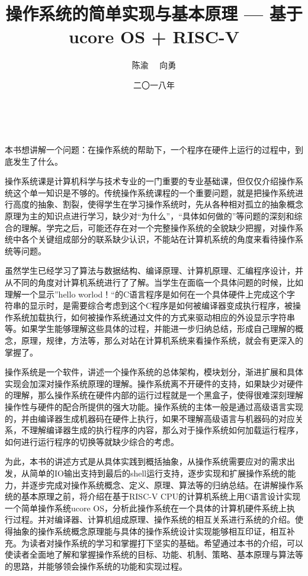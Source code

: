 \documentclass{zhbook}
\title{操作系统的简单实现与基本原理 \newline --- 基于ucore OS + RISC-V}
\author{陈渝 \ \ 向勇}
\date{二〇一八年}
\begin{document}
\, 
\maketitle

\frontmatter


本书想讲解一个问题：在操作系统的帮助下，一个程序在硬件上运行的过程中，到底发生了什么。

操作系统课是计算机科学与技术专业的一门重要的专业基础课，但仅仅介绍操作系统这个单一知识是不够的。传统操作系统课程的一个重要问题，就是把操作系统进行高度的抽象、割裂，使得学生在学习操作系统时，先从各种相对孤立的抽象概念原理为主的知识点进行学习，缺少对“为什么”，“具体如何做的”等问题的深刻和综合的理解。学完之后，可能还存在对一个完整操作系统的全貌缺少把握，对操作系统中各个关键组成部分的联系缺少认识，不能站在计算机系统的角度来看待操作系统等问题。

虽然学生已经学习了算法与数据结构、编译原理、计算机原理、汇编程序设计，并从不同的角度对计算机系统进行了了解。当学生在面临一个具体问题的时候，比如理解一个显示”hello worlod！“的C语言程序是如何在一个具体硬件上完成这个字符串的显示时，是需要综合考虑到这个C程序是如何被编译器变成执行程序，被操作系统加载执行，如何被操作系统通过文件的方式来驱动相应的外设显示字符串等。如果学生能够理解这些具体的过程，并能进一步归纳总结，形成自己理解的概念，原理，规律，方法等，那么对站在计算机系统来看操作系统，就会有更深入的掌握了。

操作系统是一个软件，讲述一个操作系统的总体架构，模块划分，渐进扩展和具体实现会加深对操作系统原理的理解。操作系统离不开硬件的支持，如果缺少对硬件的理解，那么操作系统在硬件内部的运行过程就是一个黑盒子，使得很难深刻理解操作性与硬件的配合所提供的强大功能。操作系统的主体一般是通过高级语言实现的，并由编译器生成机器码在硬件上执行，如果不理解高级语言与机器码的对应关系，不理解编译器生成的执行程序的内容，那么对于操作系统如何加载运行程序，如何进行运行程序的切换等就缺少综合的考虑。


为此，本书的讲述方式是从具体实践到概括抽象，从操作系统需要应对的需求出发，从简单的IO输出支持到最后的shell运行支持，逐步实现和扩展操作系统的能力，并逐步完成对操作系统概念、定义、原理、算法等的归纳总结。在讲解操作系统的基本原理之前，将介绍在基于RISC-V CPU的计算机系统上用C语言设计实现一个简单操作系统ucore OS，分析此操作系统在一个具体的计算机硬件系统上执行过程。并对编译器、计算机组成原理、操作系统的相互关系进行系统的介绍。使得抽象的操作系统概念原理能与具体的操作系统设计实现能够相互印证，相互补充。为读者对操作系统的学习和掌握打下坚实的基础。希望通过本书的介绍，可以使读者全面地了解和掌握操作系统的目标、功能、机制、策略、基本原理与算法等的思路，并能够领会操作系统的功能和实现过程。
\end{document}
